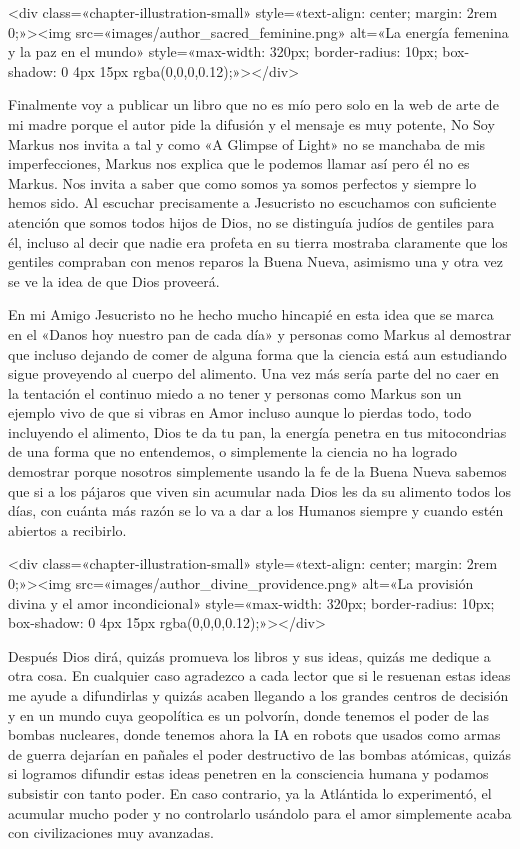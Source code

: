 \documentclass[12pt,twoside,openany]{book}
\begin{document}
<div class=«chapter-illustration-small» style=«text-align: center; margin: 2rem 0;»><img src=«images/author_sacred_feminine.png» alt=«La energía femenina y la paz en el mundo» style=«max-width: 320px; border-radius: 10px; box-shadow: 0 4px 15px rgba(0,0,0,0.12);»></div>

Finalmente voy a publicar un libro que no es mío pero solo en la web de arte de mi madre porque el autor pide la difusión y el mensaje es muy potente, No Soy Markus nos invita a tal y como «A Glimpse of Light» no se manchaba de mis imperfecciones, Markus nos explica que le podemos llamar así pero él no es Markus. Nos invita a saber que como somos ya somos perfectos y siempre lo hemos sido. Al escuchar precisamente a Jesucristo no escuchamos con suficiente atención que somos todos hijos de Dios, no se distinguía judíos de gentiles para él, incluso al decir que nadie era profeta en su tierra mostraba claramente que los gentiles compraban con menos reparos la Buena Nueva, asimismo una y otra vez se ve la idea de que Dios proveerá.

En mi Amigo Jesucristo no he hecho mucho hincapié en esta idea que se marca en el «Danos hoy nuestro pan de cada día» y personas como Markus al demostrar que incluso dejando de comer de alguna forma que la ciencia está aun estudiando sigue proveyendo al cuerpo del alimento. Una vez más sería parte del no caer en la tentación el continuo miedo a no tener y personas como Markus son un ejemplo vivo de que si vibras en Amor incluso aunque lo pierdas todo, todo incluyendo el alimento, Dios te da tu pan, la energía penetra en tus mitocondrias de una forma que no entendemos, o simplemente la ciencia no ha logrado demostrar porque nosotros simplemente usando la fe de la Buena Nueva sabemos que si a los pájaros que viven sin acumular nada Dios les da su alimento todos los días, con cuánta más razón se lo va a dar a los Humanos siempre y cuando estén abiertos a recibirlo.

<div class=«chapter-illustration-small» style=«text-align: center; margin: 2rem 0;»><img src=«images/author_divine_providence.png» alt=«La provisión divina y el amor incondicional» style=«max-width: 320px; border-radius: 10px; box-shadow: 0 4px 15px rgba(0,0,0,0.12);»></div>

Después Dios dirá, quizás promueva los libros y sus ideas, quizás me dedique a otra cosa. En cualquier caso agradezco a cada lector que si le resuenan estas ideas me ayude a difundirlas y quizás acaben llegando a los grandes centros de decisión y en un mundo cuya geopolítica es un polvorín, donde tenemos el poder de las bombas nucleares, donde tenemos ahora la IA en robots que usados como armas de guerra dejarían en pañales el poder destructivo de las bombas atómicas, quizás si logramos difundir estas ideas penetren en la consciencia humana y podamos subsistir con tanto poder. En caso contrario, ya la Atlántida lo experimentó, el acumular mucho poder y no controlarlo usándolo para el amor simplemente acaba con civilizaciones muy avanzadas.
\end{document}
